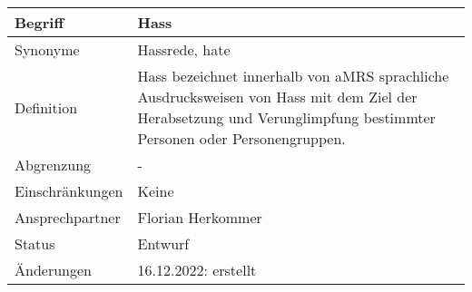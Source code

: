 \begin{table}[H]
    \centering
    \label{hass}
    \begin{tabularx}{\textwidth}{| l | X |}
        \hline
        Begriff         & Hass                                                                                                                                                                    \\
        \hline
        Synonyme        & Hassrede, hate                                                                                                                                                          \\
        \hline
        Definition      & Hass bezeichnet innerhalb von \ac{aMRS} sprachliche Ausdrucksweisen von Hass mit dem Ziel der Herabsetzung und Verunglimpfung bestimmter Personen oder Personengruppen. \\
        \hline
        Abgrenzung      & -                                                                                                                                                                       \\
        \hline
        Einschränkungen & Keine                                                                                                                                                                   \\
        \hline
        Ansprechpartner & Florian Herkommer                                                                                                                                                       \\
        \hline
        Status          & Entwurf                                                                                                                                                                 \\
        \hline
        Änderungen      & 16.12.2022: erstellt                                                                                                                                                    \\
        \hline
    \end{tabularx}
\end{table}


